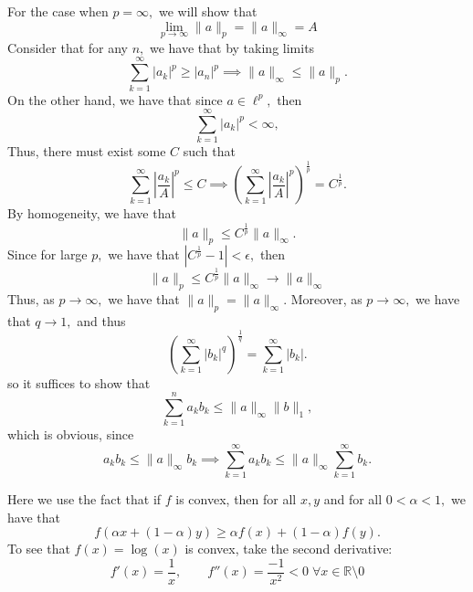 \documentclass[11pt]{article}
\newcommand{\bbR}{\mathbb{R}}
\newcommand{\sm}{\setminus}
\begin{document}
\begin{solution}
    For the case when $p = \infty,$ we will show that 
    \[\lim_{p\to \infty} \|a\|_p = \|a\|_\infty = A\] 
    Consider that for any $n,$ we have that by taking limits
    \[\sum_{k=1}^\infty |a_k|^p \geq |a_n|^p \implies \|a\|_\infty \leq \|a\|_p.\] On the other hand, we have that since $a\in \ell^p,$ then
    \[\sum_{k=1}^\infty |a_k|^p < \infty,\] Thus, there must exist some $C$ such that \[\sum_{k=1}^\infty |\frac{a_k}{A}|^p  \leq C \implies \left(\sum_{k=1}^\infty |\frac{a_k}{A}|^p\right)^\frac{1}{p}  = C^{\frac{1}{p}}.\] By homogeneity, we have that 
    \[\|a\|_p \leq C^\frac{1}{p}\|a\|_\infty.\] Since for large $p,$ we have that $|C^\frac{1}{p} - 1|< \epsilon,$ then 
    \[\|a\|_p \leq C^\frac{1}{p}\|a\|_\infty \to \|a\|_\infty\] Thus, as $p\to \infty,$ we have that $\|a\|_p = \|a\|_\infty.$ Moreover, as $p\to \infty,$ we have that $q \to 1,$ and thus 
    \[\left(\sum_{k=1}^\infty |b_k|^q\right)^\frac{1}{q} = \sum_{k=1}^\infty |b_k|.\] so it suffices to show that 
    \[\sum_{k=1}^n {a_k b_k}\leq \|a\|_\infty \|b\|_1,\] which is obvious, since 
    \[a_kb_k \leq \|a\|_\infty b_k \implies \sum_{k=1}^\infty a_k b_k \leq \|a\|_\infty \sum_{k=1}^\infty b_k.\]
\end{solution}
\begin{reflection}
    Here we use the fact that if $f$ is convex, then for all $x,y$ and for all $0 < \alpha <1,$ we have that 
    \[f(\alpha x + (1-\alpha)y) \geq \alpha f(x) + (1-\alpha)f(y).\]
    To see that $f(x) = \log(x)$ is convex, take the second derivative:
    \[f'(x) = \frac{1}{x}, \qquad f''(x) = \frac{-1}{x^2} < 0 \; \forall x\in \bbR\sm{0}\]
\end{reflection}

\newpage
\end{document}
